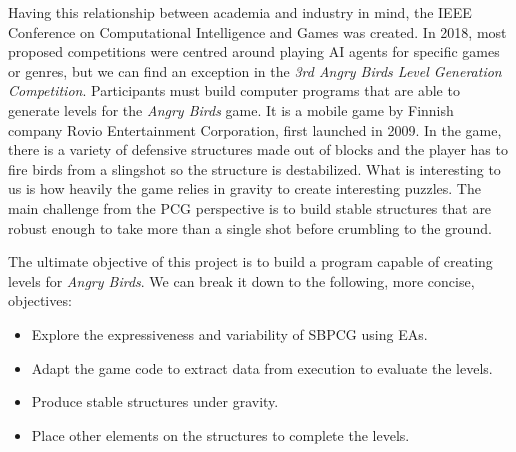 \documentclass[runningheads,a4paper]{llncs}
\begin{document}
Having this relationship between academia and industry in mind, the IEEE 
Conference on Computational Intelligence and Games was created\cite{ieee-cig}. 
In 2018, most proposed competitions were centred around playing AI agents for 
specific games or genres, but we can find an exception in the \textit{3rd Angry 
Birds Level Generation Competition}. Participants must build computer programs 
that are able to generate levels for the \textit{Angry Birds} game.
It is a mobile game by Finnish company Rovio Entertainment 
Corporation\cite{angry-birds}, first launched in 2009. 
In the game, there is a variety of defensive structures made out of blocks 
and the player has to fire birds from a slingshot
so the structure is destabilized.
What is interesting to us is how heavily the 
game relies in gravity to create interesting puzzles. The main challenge from 
the PCG perspective is to build stable structures that are robust enough to 
take more than a single shot before crumbling to the ground.


The ultimate objective of this project is to build a program capable of 
creating levels for \textit{Angry Birds}. We can break it down to the 
following, more concise, objectives:

\begin{itemize}
	\item Explore the expressiveness and variability of SBPCG using 
	EAs.
	\item Adapt the game code to extract data from execution to 
	evaluate the levels.
	\item Produce stable structures under gravity.
	\item Place other elements on the structures to complete the levels.
\end{itemize} 
\end{document}
